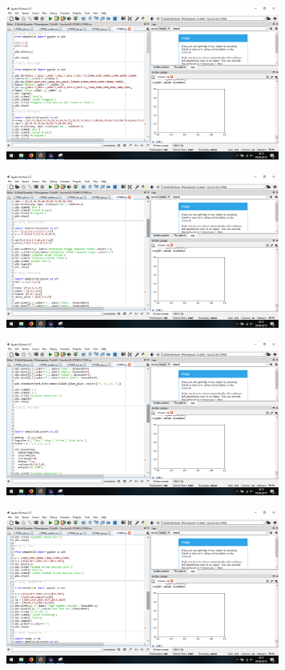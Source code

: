 \begin{figure}[H]
	\includegraphics[width=9cm]{figures/6/Praktek/1174039/c5.png}
	\centering
\end{figure}
\begin{figure}[H]
	\includegraphics[width=9cm]{figures/6/Praktek/1174039/c6.png}
	\centering
\end{figure}
\begin{figure}[H]
	\includegraphics[width=9cm]{figures/6/Praktek/1174039/c7.png}
	\centering
\end{figure}
\begin{figure}[H]
	\includegraphics[width=9cm]{figures/6/Praktek/1174039/c8.png}
	\centering
\end{figure}
